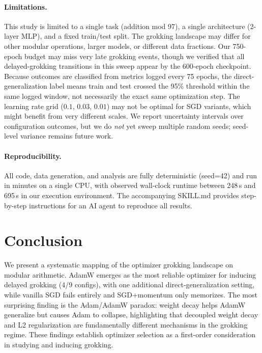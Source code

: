 \documentclass[11pt,a4paper]{article}
\begin{document}
\paragraph{Limitations.}
This study is limited to a single task (addition mod 97), a single architecture (2-layer MLP), and a fixed train/test split. The grokking landscape may differ for other modular operations, larger models, or different data fractions. Our 750-epoch budget may miss very late grokking events, though we verified that all delayed-grokking transitions in this sweep appear by the 600-epoch checkpoint. Because outcomes are classified from metrics logged every 75 epochs, the direct-generalization label means train and test crossed the 95\% threshold within the same logged window, not necessarily the exact same optimization step. The learning rate grid ($0.1$, $0.03$, $0.01$) may not be optimal for SGD variants, which might benefit from very different scales. We report uncertainty intervals over configuration outcomes, but we do \emph{not} yet sweep multiple random seeds; seed-level variance remains future work.

\paragraph{Reproducibility.}
All code, data generation, and analysis are fully deterministic (seed=42) and run in minutes on a single CPU, with observed wall-clock runtime between 248\,s and 695\,s in our execution environment. The accompanying SKILL.md provides step-by-step instructions for an AI agent to reproduce all results.

\section{Conclusion}

We present a systematic mapping of the optimizer grokking landscape on modular arithmetic. AdamW emerges as the most reliable optimizer for inducing delayed grokking (4/9 configs), with one additional direct-generalization setting, while vanilla SGD fails entirely and SGD+momentum only memorizes. The most surprising finding is the Adam/AdamW paradox: weight decay helps AdamW generalize but causes Adam to collapse, highlighting that decoupled weight decay and L2 regularization are fundamentally different mechanisms in the grokking regime. These findings establish optimizer selection as a first-order consideration in studying and inducing grokking.
\end{document}
